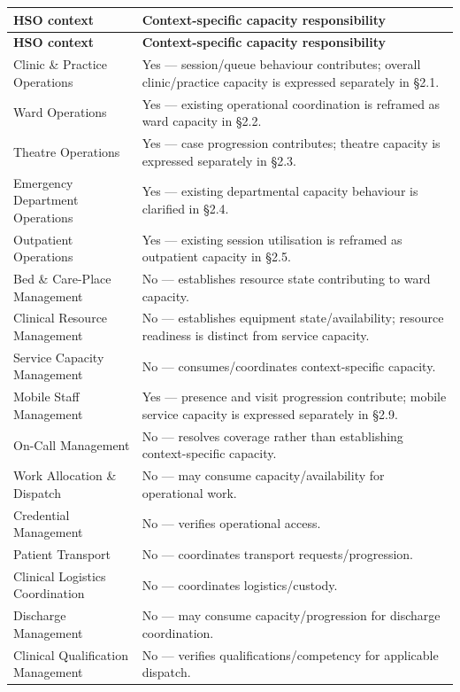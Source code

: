 \label{rad:hso:24}
\begingroup\small\setlength{\TableWidth}{\dimexpr\linewidth-4\tabcolsep-3\arrayrulewidth\relax}
\begin{longtable}{|>{\raggedright\arraybackslash}p{0.35\TableWidth}|>{\raggedright\arraybackslash}p{0.65\TableWidth}|}
\hline\rowcolor{TableHead}\textbf{HSO context} & \textbf{Context-specific capacity responsibility}\\\hline\endfirsthead
\hline\rowcolor{TableHead}\textbf{HSO context} & \textbf{Context-specific capacity responsibility}\\\hline\endhead
\hline\endfoot
Clinic \& Practice Operations & Yes — session/\allowbreak{}queue behaviour contributes; overall clinic/\allowbreak{}practice capacity is expressed separately in §2.1.\\\hline
Ward Operations & Yes — existing operational coordination is reframed as ward capacity in §2.2.\\\hline
Theatre Operations & Yes — case progression contributes; theatre capacity is expressed separately in §2.3.\\\hline
Emergency Department Operations & Yes — existing departmental capacity behaviour is clarified in §2.4.\\\hline
Outpatient Operations & Yes — existing session utilisation is reframed as outpatient capacity in §2.5.\\\hline
Bed \& Care-Place Management & No — establishes resource state contributing to ward capacity.\\\hline
Clinical Resource Management & No — establishes equipment state/\allowbreak{}availability; resource readiness is distinct from service capacity.\\\hline
Service Capacity Management & No — consumes/\allowbreak{}coordinates context-specific capacity.\\\hline
Mobile Staff Management & Yes — presence and visit progression contribute; mobile service capacity is expressed separately in §2.9.\\\hline
On-Call Management & No — resolves coverage rather than establishing context-specific capacity.\\\hline
Work Allocation \& Dispatch & No — may consume capacity/\allowbreak{}availability for operational work.\\\hline
Credential Management & No — verifies operational access.\\\hline
Patient Transport & No — coordinates transport requests/\allowbreak{}progression.\\\hline
Clinical Logistics Coordination & No — coordinates logistics/\allowbreak{}custody.\\\hline
Discharge Management & No — may consume capacity/\allowbreak{}progression for discharge coordination.\\\hline
Clinical Qualification Management & No — verifies qualifications/\allowbreak{}competency for applicable dispatch.\\\hline
\end{longtable}\endgroup
{}\label{rad:hso:43}

